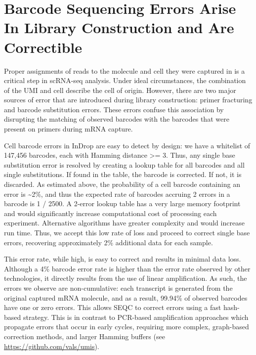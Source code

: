 \section{Barcode Sequencing Errors Arise In Library Construction and Are Correctible} 

Proper assignments of reads to the molecule and cell they were captured in is a critical step in scRNA-seq analysis. 
Under ideal circumstances, the combination of the UMI and cell describe the cell of origin. 
However, there are two major sources of error that are introduced during library construction: primer fracturing and barcode substitution errors. 
These errors confuse this association by disrupting the matching of observed barcodes with the barcodes that were present on primers during mRNA capture. 

Cell barcode errors in InDrop are easy to detect by design: we have a whitelist of 147,456 barcodes, each with Hamming distance \textgreater{}= 3. 
Thus, any single base substitution error is resolved by creating a lookup table for all barcodes and all single substitutions. 
If found in the table, the barcode is corrected.  
If not, it is discarded. 
As estimated above, the probability of a cell barcode containing an error is \textasciitilde{}2\%, and thus the expected rate of barcodes accruing 2 errors in a barcode is 1 / 2500. 
A 2-error lookup table has a very large memory footprint and would significantly increase computational cost of processing each experiment.  
Alternative algorithms have greater complexity and would increase run time. 
Thus, we accept this low rate of loss and proceed to correct single base errors, recovering approximately 2\% additional data for each sample.  

This error rate, while high, is easy to correct and results in minimal data loss. 
Although a 4\% barcode error rate is higher than the error rate observed by other technologies, it directly results from the use of linear amplification. 
As such, the errors we observe are non-cumulative: each transcript is generated from the original captured mRNA molecule, and as a result, 99.94\% of observed barcodes have one or zero errors.
This allows SEQC to correct errors using a fast hash-based strategy. 
This is in contrast to PCR-based amplification approaches which propagate errors that occur in early cycles, requiring more complex, graph-based correction methods, and larger Hamming buffers (see \href{https://github.com/vals/umis}{https://github.com/vals/umis}).


